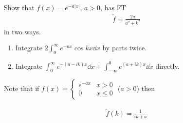 \begin{exercise}
    Show that $f(x) = e^{-a |x|}$, $a > 0$, has FT 
    \begin{align} \label{eq:8.6}
        \widetilde{f} = \frac{2a}{a^2 + k^2}
    \end{align} in two ways.
    \begin{enumerate}
        \item Integrate $2 \int_{0}^{\infty} e^{-ax} \cos kx \dd{x}$ by parts twice.
        \item Integrate $\int_{0}^{\infty} e^{-(a - ik) x} \dd{x} + \int_{-\infty}^{0} e^{(a + ik)x} \dd{x}$ directly.
    \end{enumerate} 
    Note that if $f(x) = \begin{cases}
        e^{-ax} & x > 0 \\
        0 & x \leq 0
    \end{cases}$ ($a > 0$) then 
    \addtocounter{equation}{-1}
    \begin{subequations}
        \begin{align} \label{eq:8.6a}
            \widetilde{f}(k) = \frac{1}{ik + a}
        \end{align} 
    \end{subequations}
\end{exercise} 

